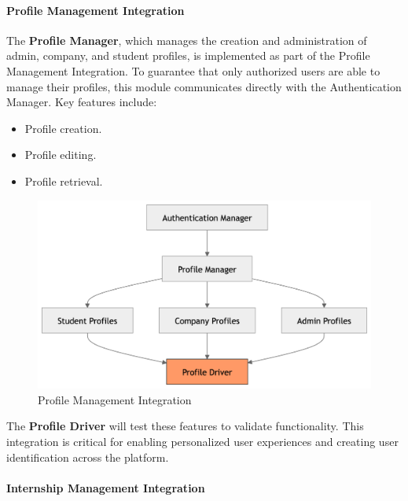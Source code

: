 \paragraph{Profile Management Integration}
The \textbf{Profile Manager}, which manages the creation and administration of admin, company, and student profiles, is implemented as part of the Profile Management Integration. To guarantee that only authorized users are able to manage their profiles, this module communicates directly with the Authentication Manager. Key features include:
\begin{itemize}
    \item Profile creation.
    \item Profile editing.
    \item Profile retrieval.
\end{itemize}
\begin{figure}[H]
    \begin{center}
        \includegraphics[width=0.79\linewidth]{JhaBhatiaSharma/imagesDD/ProfileIntegration.png}
        \caption{Profile Management Integration}
        \label{fig:profileManagement}
    \end{center}
\end{figure}
The \textbf{Profile Driver} will test these features to validate functionality. This integration is critical for enabling personalized user experiences and creating user identification across the platform.

\paragraph{Internship Management Integration}

